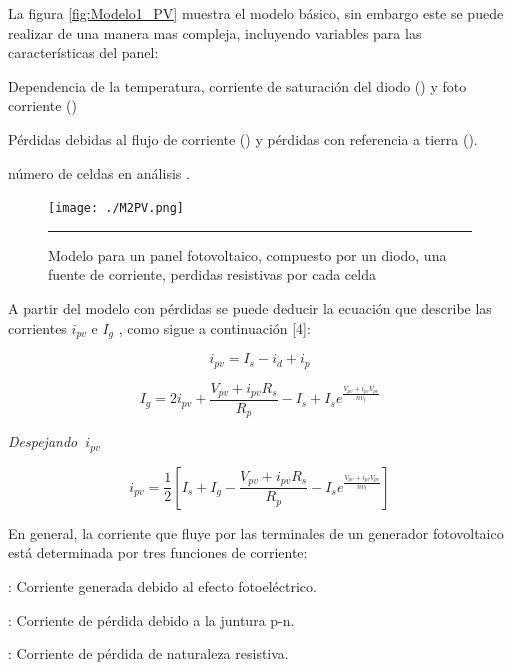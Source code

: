 La figura \ref{fig:Modelo1_PV} muestra el modelo básico, sin embargo este se puede realizar de una manera mas compleja, incluyendo variables para las características del panel: 

\begin{compactitem}

\item Dependencia de la temperatura, corriente de saturación del diodo () y foto corriente ()


\item Pérdidas debidas al flujo de corriente () y pérdidas con referencia a tierra ().

\item  número de celdas en análisis .

\end{compactitem}

\begin{figure}[H]
  \centering
    \texttt{[image: ./M2PV.png]}
    \rule{35em}{0.5pt}
  \caption[Modelo para un panel fotovoltaico, compuesto por un diodo, una fuente de corriente, perdidas resistivas por cada celda]{ Modelo para un panel fotovoltaico, compuesto por un diodo, una fuente de corriente, perdidas resistivas por cada celda}
  \label{fig:Modelo2_PV}
\end{figure}

A partir del modelo con pérdidas se puede deducir la ecuación que describe las corrientes $ i_{pv}$ e $ I_{g}$ , como sigue a continuación [4]:

\begin{equation} \label{eq:ej1}
  i_{pv}
  = I_{s} - i_{d} + i_{p}
\end{equation}

\begin{equation} \label{eq:ej2}
  I_{g}
  =
  2i_{pv} + \frac{V_{pv}+i_{pv}R_{s}}{R_p} -  I_{s} + I_{s}e^{ \frac{V_{pv}+i_{pv}V_{pv}}{n v_t}} 
\end{equation}

\textsl{Despejando $\ i_{pv}$}

\begin{equation} \label{eq:ej3}
  i_{pv} 
  =
  \frac{1}{2} \left[I_{s} + I_{g} - \frac{V_{pv}+i_{pv}R_{s}}{R_p} - I_{s}e^{ \frac{V_{pv}+i_{pv}V_{pv}}{n v_t}} \right]
\end{equation}
  
  
En general, la corriente que fluye por las terminales de un generador fotovoltaico está determinada por tres funciones de corriente:
\begin{compactitem}
\item {}: Corriente generada debido al efecto fotoeléctrico.
\item {}: Corriente de pérdida debido a la juntura p-n.
\item {}: Corriente de pérdida de naturaleza resistiva.
\end{compactitem}


